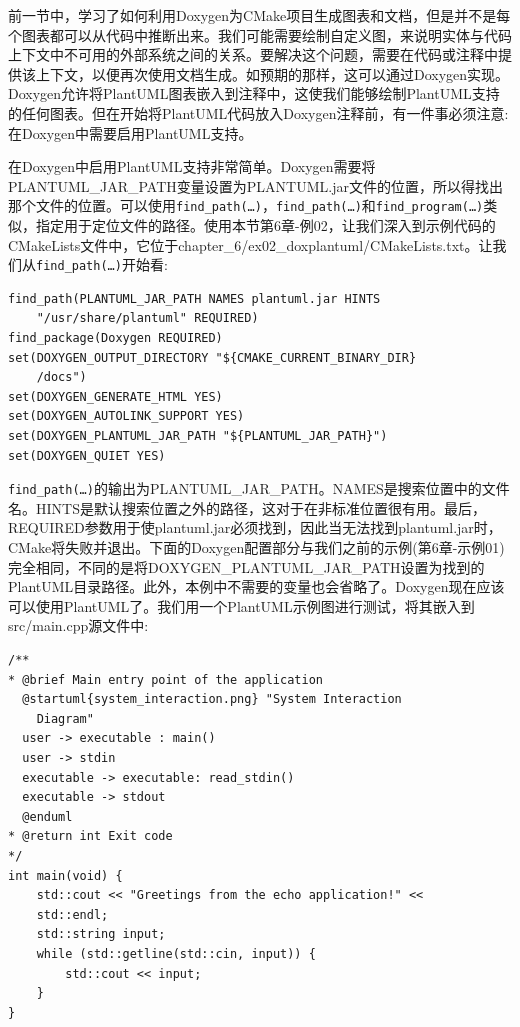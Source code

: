 
前一节中，学习了如何利用Doxygen为CMake项目生成图表和文档，但是并不是每个图表都可以从代码中推断出来。我们可能需要绘制自定义图，来说明实体与代码上下文中不可用的外部系统之间的关系。要解决这个问题，需要在代码或注释中提供该上下文，以便再次使用文档生成。如预期的那样，这可以通过Doxygen实现。Doxygen允许将PlantUML图表嵌入到注释中，这使我们能够绘制PlantUML支持的任何图表。但在开始将PlantUML代码放入Doxygen注释前，有一件事必须注意:在Doxygen中需要启用PlantUML支持。

在Doxygen中启用PlantUML支持非常简单。Doxygen需要将PLANTUML\_JAR\_PATH变量设置为PLANTUML.jar文件的位置，所以得找出那个文件的位置。可以使用\texttt{find\_path(…)}，\texttt{find\_path(…)}和\texttt{find\_program(…)}类似，指定用于定位文件的路径。使用本节第6章-例02，让我们深入到示例代码的CMakeLists文件中，它位于chapter\_6/ex02\_doxplantuml/CMakeLists.txt。让我们从\texttt{find\_path(…)}开始看:

\begin{lstlisting}[style=styleCMake]
find_path(PLANTUML_JAR_PATH NAMES plantuml.jar HINTS
	"/usr/share/plantuml" REQUIRED)
find_package(Doxygen REQUIRED)
set(DOXYGEN_OUTPUT_DIRECTORY "${CMAKE_CURRENT_BINARY_DIR}
	/docs")
set(DOXYGEN_GENERATE_HTML YES)
set(DOXYGEN_AUTOLINK_SUPPORT YES)
set(DOXYGEN_PLANTUML_JAR_PATH "${PLANTUML_JAR_PATH}")
set(DOXYGEN_QUIET YES)
\end{lstlisting}

\texttt{find\_path(…)}的输出为PLANTUML\_JAR\_PATH。NAMES是搜索位置中的文件名。HINTS是默认搜索位置之外的路径，这对于在非标准位置很有用。最后，REQUIRED参数用于使plantuml.jar必须找到，因此当无法找到plantuml.jar时，CMake将失败并退出。下面的Doxygen配置部分与我们之前的示例(第6章-示例01)完全相同，不同的是将DOXYGEN\_PLANTUML\_JAR\_PATH设置为找到的PlantUML目录路径。此外，本例中不需要的变量也会省略了。Doxygen现在应该可以使用PlantUML了。我们用一个PlantUML示例图进行测试，将其嵌入到src/main.cpp源文件中:

\begin{lstlisting}[style=styleCXX]
/**
* @brief Main entry point of the application
  @startuml{system_interaction.png} "System Interaction
    Diagram"
  user -> executable : main()
  user -> stdin
  executable -> executable: read_stdin()
  executable -> stdout
  @enduml
* @return int Exit code
*/
int main(void) {
	std::cout << "Greetings from the echo application!" <<
	std::endl;
	std::string input;
	while (std::getline(std::cin, input)) {
		std::cout << input;
	}
}
\end{lstlisting}

